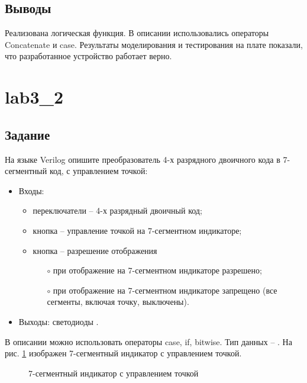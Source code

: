 \subsection{Выводы}

Реализована логическая функция. В описании использовались операторы Concatenate и case. Результаты моделирования и тестирования на плате показали, что разработанное устройство работает верно.

\newpage

\section{lab3\_2}

\subsection{Задание}

На языке Verilog опишите преобразователь 4-х разрядного двоичного кода в 7-сегментный код, с управлением точкой:
\begin{itemize}
	\item Входы:
		\begin{itemize}
			\item переключатели  -- 4-х разрядный двоичный код;
			\item кнопка  -- управление точкой на 7-сегментном индикаторе;
			\item кнопка  -- разрешение отображения
				\begin{itemize}
					\item[$\circ$] при  отображение на 7-сегментном индикаторе разрешено;
					\item[$\circ$] при  отображение на 7-сегментном индикаторе запрещено (все сегменты, включая точку, выключены).
				\end{itemize}
		\end{itemize}		
	\item Выходы: светодиоды .
\end{itemize}

В описании можно использовать операторы case, if, bitwise. Тип данных -- . На рис. \ref{fig:lab3_2_segment} изображен 7-сегментный индикатор с управлением точкой.

\begin{figure}[H]
\begin{center}
	\caption{7-сегментный индикатор с управлением точкой}
	\label{fig:lab3_2_segment}
\end{center}
\end{figure}

